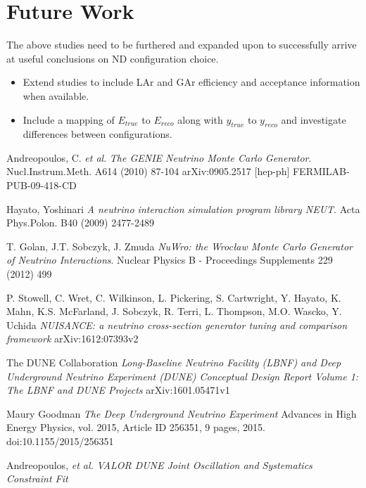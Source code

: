 \documentclass[12pt]{article}
\begin{document}
\section{Future Work}\label{sec:Future}

The above studies need to be furthered and expanded upon to successfully arrive at useful conclusions on ND configuration choice. 

\begin{itemize}


\item Extend studies to include LAr and GAr efficiency and acceptance information when available.
\item Include a mapping of $E_{true}$ to $E_{reco}$ along with $y_{true}$ to $y_{reco}$ and investigate differences between configurations.

\end{itemize}




\begin{thebibliography}{1}

Andreopoulos, C. \textit{et al}.
\textit{The GENIE Neutrino Monte Carlo Generator}.
Nucl.Instrum.Meth. A614 (2010) 87-104 arXiv:0905.2517 [hep-ph] FERMILAB-PUB-09-418-CD

Hayato, Yoshinari 
\textit{A neutrino interaction simulation program library NEUT}.
Acta Phys.Polon. B40 (2009) 2477-2489

T. Golan, J.T. Sobczyk, J. Zmuda
\textit{NuWro: the Wrocław Monte Carlo Generator of Neutrino Interactions}.
Nuclear Physics B - Proceedings Supplements 229 (2012) 499

P. Stowell, C. Wret, C. Wilkinson, L. Pickering, S. Cartwright, Y. Hayato, K. Mahn, K.S. McFarland, J. Sobczyk, R. Terri, L. Thompson, M.O. Wascko, Y. Uchida
\textit{NUISANCE: a neutrino cross-section generator tuning and comparison framework}
arXiv:1612:07393v2

The DUNE Collaboration
\textit{Long-Baseline Neutrino Facility (LBNF) and Deep Underground Neutrino Experiment (DUNE) Conceptual Design Report Volume 1: The LBNF and DUNE Projects}
arXiv:1601.05471v1

Maury Goodman
\textit{The Deep Underground Neutrino Experiment}
Advances in High Energy Physics, vol. 2015, Article ID 256351, 9 pages, 2015. doi:10.1155/2015/256351

Andreopoulos, \textit{et al.}
\textit{VALOR DUNE Joint Oscillation and Systematics Constraint Fit}


\end{thebibliography}
\end{document}
